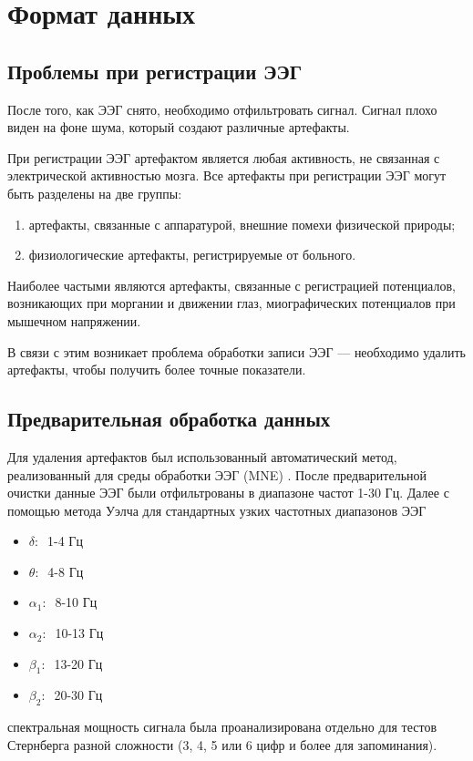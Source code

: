 \newpage

\section{Формат данных}

\subsection{Проблемы при регистрации ЭЭГ}

После того, как ЭЭГ снято, необходимо отфильтровать сигнал. Сигнал плохо виден
на фоне шума, который создают различные артефакты.  

При регистрации ЭЭГ артефактом является любая активность, не связанная с электрической
активностью мозга. Все артефакты при регистрации ЭЭГ могут быть разделены на две группы:
\begin{enumerate}
    \item артефакты, связанные с аппаратурой, внешние помехи физической природы; 
    \item физиологические артефакты, регистрируемые от больного. 
\end{enumerate}
Наиболее частыми являются артефакты, связанные с регистрацией потенциалов, возникающих при моргании и движении глаз,
миографических потенциалов при мышечном напряжении.  

В связи с этим возникает проблема обработки записи ЭЭГ --- необходимо
удалить артефакты, чтобы получить более точные показатели.

\label{sec:chapter_3_2}
\subsection{Предварительная обработка данных}

Для удаления артефактов был использованный автоматический метод, реализованный для
среды обработки ЭЭГ (MNE) \cite{MNE}. После предварительной очистки данные ЭЭГ были
отфильтрованы в диапазоне частот 1-30 Гц. Далее с помощью метода Уэлча для стандартных
узких частотных диапазонов ЭЭГ
\begin{itemize}
    \item $\delta:\:$ 1-4 Гц
    \item $\theta:\:$ 4-8 Гц
    \item $\alpha_1:\:$ 8-10 Гц
    \item $\alpha_2:\:$ 10-13 Гц
    \item $\beta_1:\:$ 13-20 Гц
    \item $\beta_2:\:$ 20-30 Гц
\end{itemize}
спектральная мощность сигнала была проанализирована отдельно для тестов Стернберга
разной сложности (3, 4, 5 или 6 цифр и более для запоминания).

